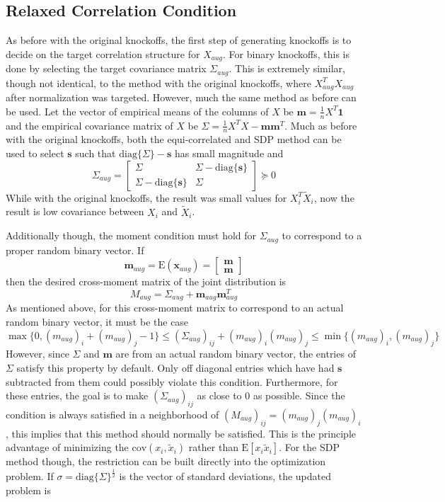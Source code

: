 \documentclass[11pt]{article}
\newcommand{\E}{\mathrm{E}}
\newcommand{\diag}[1]{\mathrm{diag}\{#1\}}
\theoremstyle{definition}
\begin{document}
\subsection{Relaxed Correlation Condition}
As before with the original knockoffs, the first step of generating knockoffs is to decide on the target correlation structure for $X_{aug}$. For binary knockoffs, this is done by selecting the target covariance matrix $\Sigma_{aug}$. This is extremely similar, though not identical, to the method with the original knockoffs, where $X_{aug}^TX_{aug}$ after normalization was targeted. However, much the same method as before can be used. Let the vector of empirical means of the columns of $X$ be $\mathbf m = \frac{1}{n}X^T\mathbf 1$ and the empirical covariance matrix of $X$ be $\Sigma = \frac{1}{n}X^TX - \mathbf{m}\mathbf{m}^T$. Much as before with the original knockoffs, both the equi-correlated and SDP method can be used to select  $\mathbf s$  such that $\diag{\Sigma}-\mathbf s$ has small magnitude and 
        \[ \Sigma_{aug} = \left[\begin{array}{cc}  \Sigma & \Sigma - \diag{\mathbf s }\\ \Sigma - \diag{\mathbf s} & \Sigma \end{array}\right] \succeq 0 \]
    While with the original knockoffs, the result was small values for $X_i^T\tilde X_i$, now the result is low covariance between $X_i$ and $\tilde X_i$.\par
    Additionally though, the moment condition must hold for $\Sigma_{aug}$ to correspond to a proper random binary vector. If 
    \[\mathbf m_{aug} = \E\left(\mathbf x_{aug}\right) = \left[\begin{array}{c}\mathbf m \\ \mathbf m \end{array}\right] \]
    then the desired cross-moment matrix of the joint distribution is 
        \[ M_{aug} = \Sigma_{aug} + \mathbf m_{aug}\mathbf m_{aug}^T\]
        As mentioned above, for this cross-moment matrix to correspond to an actual random binary vector, it must be the case  
        \[\max\{0,(m_{aug})_i + ( m_{aug})_j -1\} \leq (\Sigma_{aug})_{ij} +  (m_{aug})_i  (m_{aug})_j \leq \min\{( m_{aug})_i, ( m_{aug})_j\} \]
    However, since $\Sigma$ and $\mathbf m$ are from an actual random binary vector, the entries of $\Sigma$ satisfy this property by default. Only off diagonal entries which have had $\mathbf s$ subtracted from them could possibly violate this condition. Furthermore, for these entries, the goal is to make $(\Sigma_{aug})_{ij}$ as close to $0$ as possible. Since the condition is always satisfied in a neighborhood of $(M_{aug})_{ij} = (m_{aug})_j(m_{aug})_i$, this implies that this method should normally be satisfied. This is the principle advantage of minimizing the $\textrm{cov}(x_i,\tilde x_i)$ rather than $\E[x_i\tilde x_i]$. For the SDP method though, the restriction can be built directly into the optimization problem. If $\sigma = \diag{\Sigma}^{\frac{1}{2}}$ is the vector of standard deviations, the updated problem is
\end{document}
